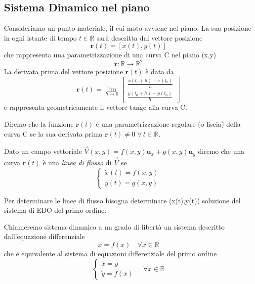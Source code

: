\subsection{Sistema Dinamico nel piano }

Consideriamo un punto materiale, il cui moto avviene nel piano. La sua posizione in ogni istante di tempo $t \in \mathbb{R}$ sar\`{a} descritta dal vettore posizione
\begin{equation}
	\bm{r}(t) = \left [ x(t),y(t) \right ]
\end{equation}
che rappresenta una parametrizzazione di una curva C nel piano (x,y)
\begin{equation*}
	\bm{r} : \mathbb{R} \rightarrow \mathbb{R}^2
\end{equation*}
La derivata prima del vettore posizione $\bm{\dot{r}}(t)$  \`{e} data da 
\begin{equation*}
	\bm{\dot{r}}(t) = \lim_{h \rightarrow 0} \left [\begin{array}{c}
		\frac{x(t_0 +h) - x(t_0)}{h} \\[0.1in]
		\frac{y(t_0 + h) - y(t_0)}{h}
	\end{array} \right ]
\end{equation*}
e rappresenta geometricamente il vettore tange alla curva C.

\begin{definition}
	Diremo che la funzione $\bm{r}(t)$ \`{e} una parametrizzazione regolare (o liscia) della curva C se la sua derivata prima $\bm{\dot{r}}(t)  \neq 0 \; \forall \,t \in \mathbb{R}$.
\end{definition}

\begin{definition}
Dato un campo vettoriale $\vec{V}(x,y) = f(x,y) \bm{u}_{x} +g(x,y)\bm{u}_{y}$ diremo che una curva $\bm{r}(t)$ \`{e} una \textit{linea di flusso} di $\vec{V}$ se 
\begin{equation}
	\left \{ \begin{array}{l}
		\dot{x}(t) = f(x,y)\\
		\dot{y}(t) = g(x,y)
	\end{array} \right. 
\end{equation}
\end{definition}
\noindent Per determinare le linee di flusso bisogna determinare (x(t),y(t)) soluzione del sistema di EDO del primo ordine.


\begin{definition}
	Chiameremo sistema dinamico a un grado di libert\`{a} un sistema descritto dall'equazione differenziale
	\begin{equation}
		\ddot{x} = f(x) \quad \forall x \in \mathbb{R}
	\end{equation}
	\newpage 
che \`{e} equivalente al sistema di equazioni differenziale del primo ordine
\begin{equation*}
	\left \{ \begin{array}{l}
		\dot{x} = y \\
		\dot{y} = f(x)
	\end{array} \right.  \quad \forall x \in \mathbb{R}
\end{equation*}
\end{definition}

